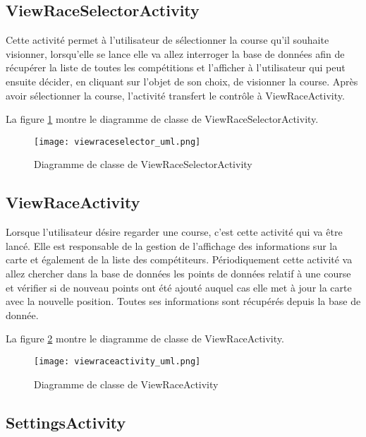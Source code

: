 
\subsection{ViewRaceSelectorActivity}

Cette activité permet à l'utilisateur de sélectionner la course qu'il souhaite visionner, lorsqu'elle se lance elle va allez interroger la base de données afin de récupérer la liste de toutes les compétitions et l'afficher à l'utilisateur qui peut ensuite décider, en cliquant sur l'objet de son choix, de visionner la course. Après avoir sélectionner la course, l'activité transfert le contrôle à ViewRaceActivity.

La figure \ref{fig:viewraceselector_uml} montre le diagramme de classe de ViewRaceSelectorActivity.

\begin{figure}[htb]
\centering 
\texttt{[image: viewraceselector\_uml.png]} 
\caption{Diagramme de classe de ViewRaceSelectorActivity}
\label{fig:viewraceselector_uml}
 \end{figure}


\subsection{ViewRaceActivity}

Lorsque l'utilisateur désire regarder une course, c'est cette activité qui va être lancé. Elle est responsable de la gestion de l'affichage des informations sur la carte et également de la liste des compétiteurs. Périodiquement cette activité va allez chercher dans la base de données les points de données relatif à une course et vérifier si de nouveau points ont été ajouté auquel cas elle met à jour la carte avec la nouvelle position. Toutes ses informations sont récupérés depuis la base de donnée.

La figure \ref{fig:viewraceactivity_uml} montre le diagramme de classe de ViewRaceActivity.

\begin{figure}[htb]
\centering 
\texttt{[image: viewraceactivity\_uml.png]} 
\caption{Diagramme de classe de ViewRaceActivity}
\label{fig:viewraceactivity_uml}
 \end{figure}


\subsection{SettingsActivity}

